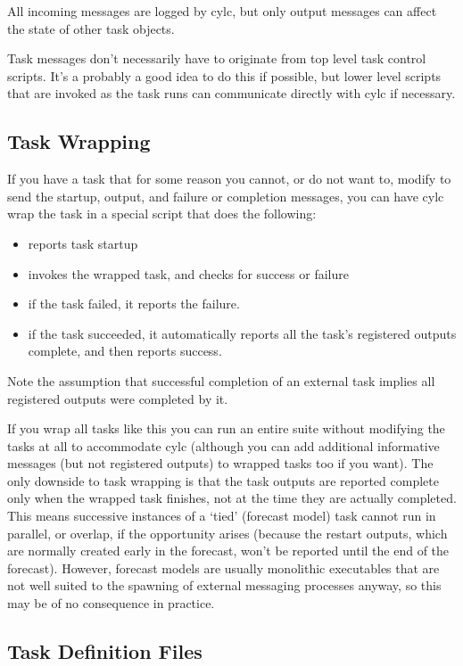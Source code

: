 \documentclass[11pt,a4paper]{article}
\begin{document}
All incoming messages are logged by cylc, but only output messages can
affect the state of other task objects.

Task messages don't necessarily have to originate from top level task
control scripts. It's a probably a good idea to do this if possible, but
lower level scripts that are invoked as the task runs can communicate
directly with cylc if necessary.

\subsection{Task Wrapping}
\label{TaskWrapping}

If you have a task that for some reason you cannot, or do not want to,
modify to send the startup, output, and failure or completion messages, 
you can have cylc wrap the task in a special script that does the following:

\begin{itemize}
    \item reports task startup
    \item invokes the wrapped task, and checks for success or failure
    \item if the task failed, it reports the failure. 
    \item if the task succeeded, it automatically reports all the task's
        registered outputs complete, and then reports success.
\end{itemize}

Note the assumption that successful completion of an external task
implies all registered outputs were completed by it.

If you wrap all tasks like this you can run an entire suite without
modifying the tasks at all to accommodate cylc (although you can 
add additional informative messages (but not registered outputs) to
wrapped tasks too if you want). The only downside to task wrapping is
that the task outputs are reported complete only when the wrapped
task finishes, not at the time they are actually completed. This means
successive instances of a `tied' (forecast model) task cannot run in
parallel, or overlap, if the opportunity arises (because the restart
outputs, which are normally created early in the forecast, won't be
reported until the end of the forecast).  However, forecast models are
usually monolithic executables that are not well suited to the spawning
of external messaging processes anyway, so this may be of no consequence
in practice.

\subsection{Task Definition Files} 
\label{TaskDefinitionFiles}
\end{document}
